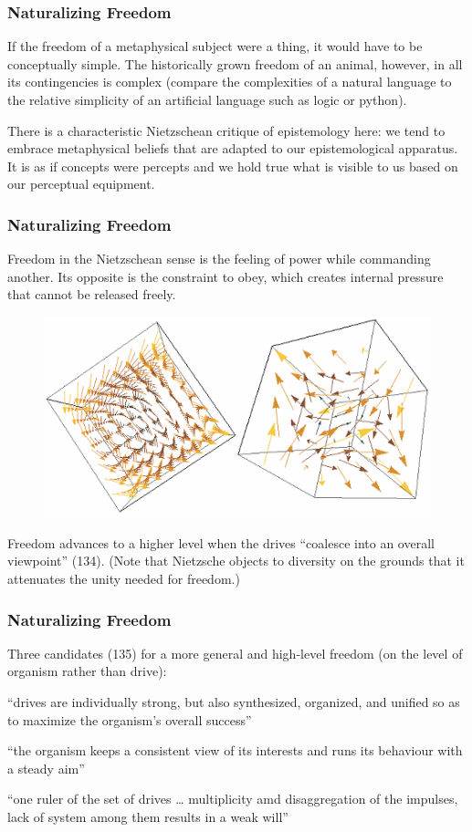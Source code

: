 \documentclass[xcolor=dvipsnames]{beamer}
\begin{document}
\begin{frame}
  \frametitle{Naturalizing Freedom}
If the freedom of a metaphysical subject were a thing, it would have
to be conceptually simple. The historically grown freedom of an
animal, however, in all its contingencies is complex (compare the
complexities of a natural language to the relative simplicity of an
artificial language such as logic or python).

\bigskip

There is a characteristic Nietzschean critique of epistemology here:
we tend to embrace metaphysical beliefs that are adapted to our
epistemological apparatus. It is as if concepts were percepts and we
hold true what is visible to us based on our perceptual equipment.
\end{frame}

\begin{frame}
  \frametitle{Naturalizing Freedom}
  Freedom in the Nietzschean sense is the feeling of power while
  commanding another. Its opposite is the constraint to obey, which
  creates internal pressure that cannot be released freely.
    \begin{figure}[h]
    \includegraphics[scale=1.2]{./3D-vector-field.png}
  \end{figure}
  Freedom advances to a higher level when the drives ``coalesce into an
  overall viewpoint'' (134). (Note that Nietzsche objects to diversity
  on the grounds that it attenuates the unity needed for freedom.)
\end{frame}

\begin{frame}
  \frametitle{Naturalizing Freedom}
  Three candidates (135) for a more general and high-level freedom (on
  the level of organism rather than drive):
  \begin{description}
  \item[coherence] ``drives are individually strong, but also synthesized,
    organized, and unified so as to maximize the organism's overall
    success''
  \item[stable structure] ``the organism keeps a consistent view of its interests and
    runs its behaviour with a steady aim''
  \item[pyramid hierarchy] ``one ruler of the set of drives {\ldots}
    multiplicity amd disaggregation of the impulses, lack of system
    among them results in a weak will''
  \item 
  \end{description}
\end{frame}
\end{document}
